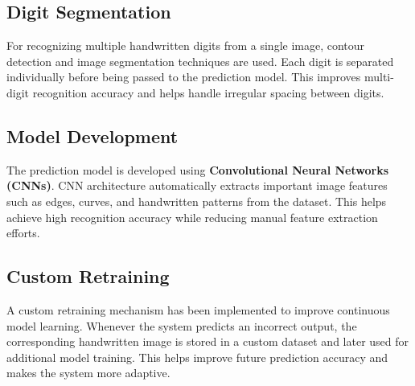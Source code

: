 \documentclass[12pt,a4paper]{article}
\begin{document}

\subsection{Digit Segmentation}

\vspace{0.2cm}

\noindent
For recognizing multiple handwritten digits from a single image, contour detection and image segmentation techniques are used. Each digit is separated individually before being passed to the prediction model. This improves multi-digit recognition accuracy and helps handle irregular spacing between digits.

\vspace{0.4cm}


\subsection{Model Development}

\vspace{0.2cm}

\noindent
The prediction model is developed using \textbf{Convolutional Neural Networks (CNNs)}. CNN architecture automatically extracts important image features such as edges, curves, and handwritten patterns from the dataset. This helps achieve high recognition accuracy while reducing manual feature extraction efforts.

\vspace{0.4cm}


\subsection{Custom Retraining}

\vspace{0.2cm}

\noindent
A custom retraining mechanism has been implemented to improve continuous model learning. Whenever the system predicts an incorrect output, the corresponding handwritten image is stored in a custom dataset and later used for additional model training. This helps improve future prediction accuracy and makes the system more adaptive.

\vspace{0.4cm}
\end{document}
